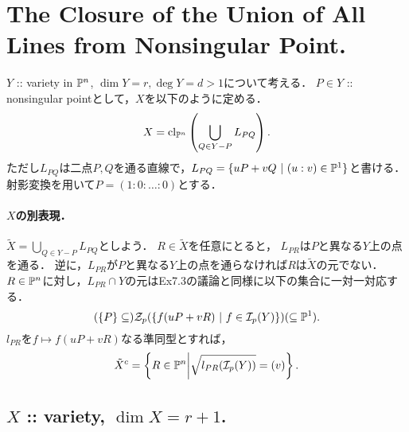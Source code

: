 \documentclass[a4paper]{jsarticle}
\begin{document}



\section{The Closure of the Union of All Lines from Nonsingular Point.} %
    $Y$ :: variety in $\mathbb{P}^n$, $\dim Y=r, \deg Y=d>1$について考える．
    $P \in Y$ :: nonsingular pointとして，$X$を以下のように定める．
    \[ X=\operatorname{cl}_{\mathbb{P}^n} \left( \bigcup_{Q \in Y-P} L_{PQ} \right). \]
    ただし$L_{PQ}$は二点$P,Q$を通る直線で，$L_{PQ}=\{uP+vQ ~|~ (u:v) \in \mathbb{P}^1\}$と書ける．
    射影変換を用いて$P=(1:0:\dots:0)$とする．

    \paragraph{$X$の別表現．}
    $\tilde{X}=\bigcup_{Q \in Y-P} L_{PQ}$としよう．
    $R \in \tilde{X}$を任意にとると，
    $L_{PR}$は$P$と異なる$Y$上の点を通る．
    逆に，$L_{PR}$が$P$と異なる$Y$上の点を通らなければ$R$は$\tilde{X}$の元でない．
    $R \in \mathbb{P}^n$に対し，$L_{PR} \cap Y$の元はEx7.3の議論と同様に以下の集合に一対一対応する．
    \[ (\{P\} \subseteq )\mathcal{Z}_p(\{ f(uP+vR) ~|~ f \in \mathcal{I}_p(Y)\}) (\subseteq \mathbb{P}^1). \]
    $l_{PR}$を$f \mapsto f(uP+vR)$なる準同型とすれば，
    \[ \tilde{X}^c=\left\{ R \in \mathbb{P}^n \middle| \sqrt{l_{PR}(\mathcal{I}_p(Y))}=(v) \right\}. \]

    \subsection{$X$ :: variety, $\dim X=r+1$.}
\end{document}
